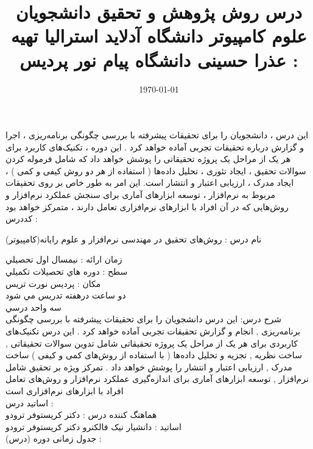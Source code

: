 \documentclass[a4 paper,12pt]{article}\usepackage{float, graphicx,xepersian }
\title{درس روش پژوهش و تحقیق دانشجويان علوم كامپيوتر دانشگاه آدلايد استراليا  تهیه : عذرا حسینی دانشگاه پیام نور پردیس }
\date{\today}
\begin{document}
	
\maketitle




\noindent
\vspace{0.1cm}
\vspace{0.1cm}


  \vspace{0.1cm}

\vspace{0.1cm}     
\noindent
این درس ، دانشجویان را برای تحقیقات پیشرفته با بررسی چگونگی برنامه‌ریزی ، اجرا و گزارش درباره تحقیقات تجربی آماده خواهد کرد . این دوره ، تکنیک‌های کاربرد برای هر یک از مراحل یک پروژه تحقیقاتی را پوشش خواهد داد که شامل فرموله کردن سوالات تحقیق ، ایجاد تئوری ، تحلیل داده‌ها ( استفاده از هر دو روش کیفی و کمی ) ، ایجاد مدرک ، ارزیابی اعتبار و انتشار است. این امر به طور خاص بر روی تحقیقات مربوط به نرم‌افزار ، توسعه ابزارهای آماری برای سنجش عملکرد نرم‌افزار و روش‌هایی که در آن افراد با ابزارهای نرم‌افزاری تعامل دارند ، متمرکز خواهد بود\\


كددرس :                  


\vspace{0.1cm}
\vspace{0.1cm}
\vspace{0.1cm}
\noindent
                                                                                           نام درس : روش‌های تحقیق در مهندسی نرم‌افزار و علوم رایانه(كامپيوتر) 

\noindent
زمان ارائه : نيمسال اول تحصيلي \\
سطح : دوره هاي تحصيلات تكميلي\\ 
مكان : پرديس نورت تريس\\
                                                                                                                                                             دو ساعت درهفته تدريس مي شود\\
                                                                                                                                                             سه واحد درسي\\
\noindent   
     شرح درس:  این درس دانشجویان را برای تحقیقات پیشرفته با بررسی چگونگی برنامه‌ریزی , انجام و گزارش تحقیقات تجربی آماده خواهد کرد . این درس تکنیک‌های کاربردی برای هر یک از مراحل یک پروژه تحقیقاتی شامل تدوین سوالات تحقیقاتی , ساخت نظریه , تجزیه و تحلیل داده‌ها ( با استفاده از روش‌های کمی و کیفی ) ساخت مدرک , ارزیابی اعتبار و انتشار را پوشش خواهد داد . تمرکز ویژه بر تحقیق شامل نرم‌افزار , توسعه ابزارهای آماری برای اندازه‌گیری عملکرد نرم‌افزار و روش‌های تعامل افراد با ابزارهای نرم‌افزاری است \\
اساتيد درس : \\
هماهنگ کننده درس : دکتر کریستوفر ترودو \\     
اساتید : دانشیار نیک فالکنرو دکتر کریستوفر ترودو\\
جدول زمانی دوره (درس) :\\
\end{document}
